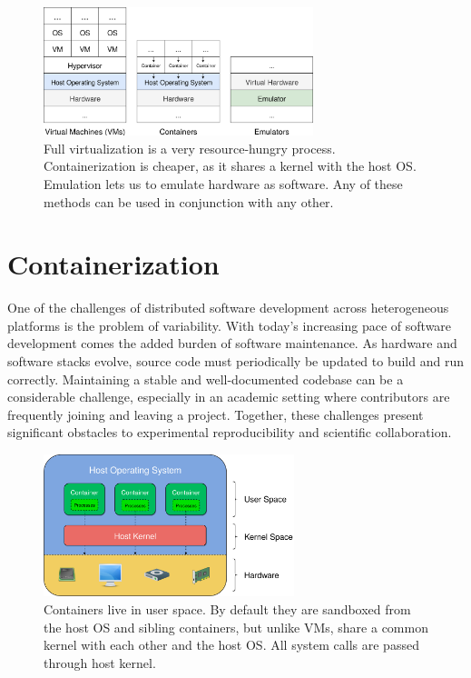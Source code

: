 \documentclass[12pt,initial,twoside,maitrise]{dms}
\numberwithin{equation}{section}
\numberwithin{table}{chapter}
\numberwithin{figure}{chapter}
\begin{document}
\begin{figure}
    \centering
    \includegraphics[width=0.70\textwidth]{vms_containers_emulators.png}
    \caption{Full virtualization is a very resource-hungry process. Containerization is cheaper, as it shares a kernel with the host OS. Emulation lets us to emulate hardware as software. Any of these methods can be used in conjunction with any other.\vspace{-10pt}}
    \label{fig:vms_containers_emulators}
\end{figure}

\section{Containerization}\label{sec:containerization}

One of the challenges of distributed software development across heterogeneous platforms is the problem of variability. With today's increasing pace of software development comes the added burden of software maintenance. As hardware and software stacks evolve, source code must periodically be updated to build and run correctly. Maintaining a stable and well-documented codebase can be a considerable challenge, especially in an academic setting where contributors are frequently joining and leaving a project. Together, these challenges present significant obstacles to experimental reproducibility and scientific collaboration.

\begin{figure}[ht]
    \centering
    \includegraphics[width=0.65\textwidth]{user_kernel_hardware.png}
    \caption{Containers live in user space. By default they are sandboxed from the host OS and sibling containers, but unlike VMs, share a common kernel with each other and the host OS. All system calls are passed through host kernel.}
    \label{fig:user_kernel_hardware}
\end{figure}
\end{document}

